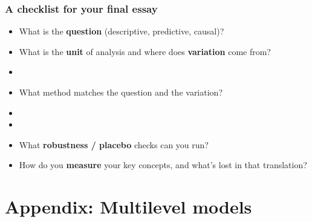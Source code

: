 \begin{frame}
\frametitle{A checklist for your final essay}
\centering

\begin{itemize}[<+->]
\item What is the \textbf{question} (descriptive, predictive, causal)?
\item What is the \textbf{unit} of analysis and where does \textbf{variation} come from?
\item {}
\item What method matches the question and the variation?
\item {}
\item {}
\item What \textbf{robustness / placebo} checks can you run?
\item How do you \textbf{measure} your key concepts, and what's lost in that translation?
\end{itemize}

\end{frame}

\appendix

\section{Appendix: Multilevel models}

